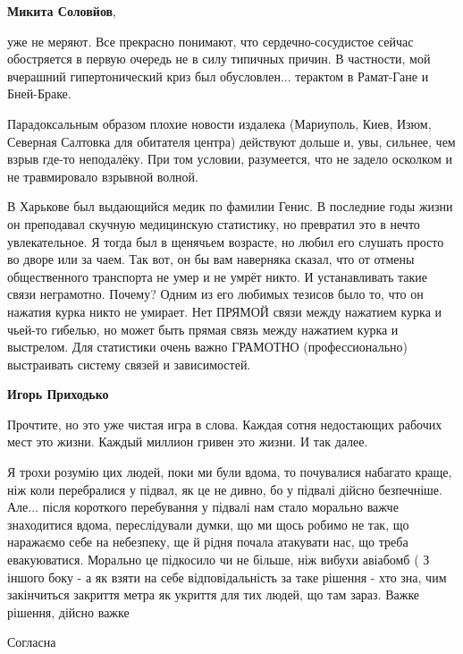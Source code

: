 \begin{itemize}
\begin{itemize}
\textbf{Микита Соловйов}, 

уже не меряют. Все прекрасно понимают, что сердечно-сосудистое сейчас
обостряется в первую очередь не в силу типичных причин. В частности, мой
вчерашний гипертонический криз был обусловлен... терактом в Рамат-Гане и
Бней-Браке.

Парадоксальным образом плохие новости издалека (Мариуполь, Киев, Изюм, Северная
Салтовка для обитателя центра) действуют дольше и, увы, сильнее, чем взрыв
где-то неподалёку. При том условии, разумеется, что не задело осколком и не
травмировало взрывной волной.

В Харькове был выдающийся медик по фамилии Генис. В последние годы жизни он
преподавал скучную медицинскую статистику, но превратил это в нечто
увлекательное. Я тогда был в щенячьем возрасте, но любил его слушать просто во
дворе или за чаем. Так вот, он бы вам наверняка сказал, что от отмены
общественного транспорта не умер и не умрёт никто. И устанавливать такие связи
неграмотно. Почему? Одним из его любимых тезисов было то, что он нажатия курка
никто не умирает. Нет ПРЯМОЙ связи между нажатием курка и чьей-то гибелью, но
может быть прямая связь между нажатием курка и выстрелом. Для статистики очень
важно ГРАМОТНО (профессионально) выстраивать систему связей и зависимостей.

\textbf{Игорь Приходько} 

Прочтите, но это уже чистая игра в слова. Каждая сотня недостающих рабочих мест
это жизни. Каждый миллион гривен это жизни. И так далее.


\end{itemize} %


Я трохи розумію цих людей, поки ми були вдома, то почувалися набагато краще,
ніж коли перебралися у підвал, як це не дивно, бо у підвалі дійсно безпечніше.
Але... після короткого перебування у підвалі нам стало морально важче
знаходитися вдома, переслідували думки, що ми щось робимо не так, що наражаємо
себе на небезпеку, ще й рідня почала атакувати нас, що треба евакуюватися.
Морально це підкосило чи не більше, ніж вибухи авіабомб ( З іншого боку - а як
взяти на себе відповідальність за таке рішення - хто зна, чим закінчиться
закриття метра як укриття для тих людей, що там зараз. Важке рішення, дійсно
важке

Согласна



\end{itemize}
